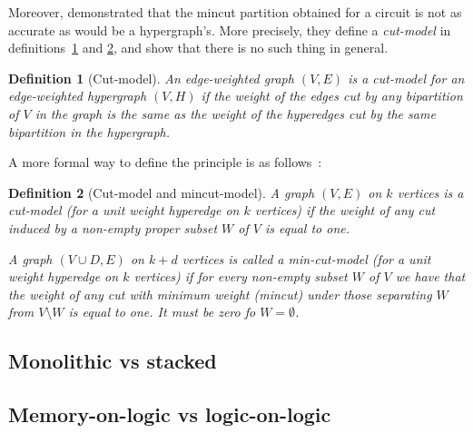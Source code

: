 \documentclass[11pt,a4paper]{article}
\theoremstyle{customdef}
\newtheorem{definition}{Definition}
\begin{document}
Moreover, \citet{Ihler1993} demonstrated that the mincut partition obtained for a circuit is not as accurate as would be a hypergraph's.
More precisely, they define a \textit{cut-model} in definitions~\ref{def:cut-model} and \ref{def:cut-model-formal}, and show that there is no such thing in general.

\begin{definition}[Cut-model]\label{def:cut-model}
An edge-weighted graph $(V,E)$ is a cut-model for an edge-weighted hypergraph $(V,H)$ if the weight of the edges cut by any bipartition of $V$ in the graph is the same as the weight of the hyperedges cut by the same bipartition in the hypergraph.
\end{definition}

A more formal way to define the principle is as follows~:
\begin{definition}[Cut-model and mincut-model]\label{def:cut-model-formal}
A graph $(V, E)$ on $k$ vertices is a cut-model (for a unit weight hyperedge on $k$ vertices) if the weight of any cut induced by a non-empty proper subset $W$ of $V$ is equal to one.

A graph $(V \cup D,E)$ on $k+d$ vertices is called a min-cut-model (for a unit weight hyperedge on $k$ vertices) if for every non-empty subset $W$ of $V$ we have that the weight of any cut with minimum weight (mincut) under those separating $W$ from $V \setminus W$ is equal to one.
It must be zero fo $W=\emptyset$.%
\end{definition}

\subsection{Monolithic vs stacked}
\subsection{Memory-on-logic vs logic-on-logic}




\end{document}
